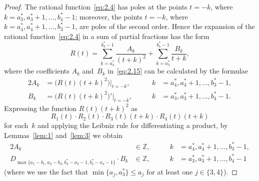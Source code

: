 \documentclass[a4paper,twoside]{article}
\numberwithin{equation}{section}
\renewcommand{\[}{\lfloor}
\renewcommand{\]}{\rfloor}
\newcommand{\<}{\langle}
\renewcommand{\>}{\rangle}
\begin{document}
\begin{proof}
The rational function~\eqref{eq:2.4} has poles
at the points $t=-k$,
where $k=a_3^*,a_3^*+1,\dots,b_4^*-1$;
moreover, the points $t=-k$,
where $k=a_4^*,a_4^*+1,\dots,b_3^*-1$,
are poles of the second order.
Hence the expansion of the rational function~\eqref{eq:2.4}
in a sum of partial fractions has the form
\begin{equation}
R(t)=\sum_{k=a_4^*}^{b_3^*-1}\frac{A_k}{(t+k)^2}
+\sum_{k=a_3^*}^{b_4^*-1}\frac{B_k}{t+k},
\label{eq:2.15}
\end{equation}
where the coefficients $A_k$ and~$B_k$ in~\eqref{eq:2.15}
can be calculated by the formulae
$$
\begin{alignedat}{2}{2}
A_k&=\bigl(R(t)(t+k)^2\bigr)\big|_{t=-k}, \qquad&
k&=a_4^*,a_4^*+1,\dots,b_3^*-1,
\\
B_k&=\bigl(R(t)(t+k)^2\bigr)'\big|_{t=-k}, \qquad&
k&=a_3^*,a_3^*+1,\dots,b_4^*-1.
\end{alignedat}
$$
Expressing the function $R(t)(t+k)^2$ as
$$
R_1(t)\cdot R_2(t)\cdot R_3(t)(t+k)\cdot R_4(t)(t+k)
$$
for each~$k$ and applying the Leibniz rule for differentiating
a product, by Lemmas~\ref{lem:1} and~\ref{lem:3} we obtain
\begin{equation}
\begin{alignedat}{2}{2}
A_k&\in\mathbb Z,
\qquad&
k&=a_4^*,a_4^*+1,\dots,b_3^*-1,
\\
D_{\max\{a_1-b_1,a_2-b_2,b_4^*-a_3-1,b_4^*-a_4-1\}}
\cdot B_k&\in\mathbb Z,
\qquad&
k&=a_3^*,a_3^*+1,\dots,b_4^*-1
\end{alignedat}
\label{eq:2.16}
\end{equation}
(where we use the fact that $\min\{a_j,a_3^*\}\le a_j$
for at least one $j\in\{3,4\}$).


\end{proof}
\end{document}
